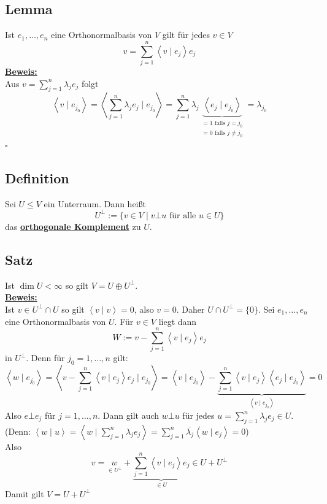 \subsection{Lemma} %
\label{sub:lemma_14.10}
Ist $e_1, \ldots , e_n$ eine Orthonormalbasis von $V$ gilt für jedes $v \in V$
\[
	v = \sum\limits_{j=1}^{n} \left\langle v \mid e_j \right\rangle  e_j 
\]
\underline{\textbf{Beweis:}} \\
Aus $v= \sum\limits_{j=1}^{n} \lambda_j e_j$ folgt
\[
	\left\langle v \mid e_{j_0} \right\rangle = \left\langle \sum\limits_{j=1}^{n} \lambda_j e_j \mid e_{j_0} \right\rangle 
	= \sum\limits_{j=1}^{n} \lambda_j \underbrace{\left\langle e_j \mid e_{j_0} \right\rangle}
	_{\substack{= 1 \text{ falls } j=j_0 \\ = 0 \text{ falls }j \not= j_0}}=\lambda_{j_0}
\]
\hfill \( \square \)

\subsection{Definition} %
\label{sub:definition_14.11}
Sei $U \le V$ ein Unterraum. Dann heißt
\[
	U^\bot := \Big\{ v \in V \mid v \bot u \text{ für alle } u \in U \Big\}
\]
das \underline{\textbf{orthogonale Komplement}} zu $U$.

\subsection{Satz} %
\label{sub:satz_14.12}
Ist $\dim U < \infty$ so gilt $V=U \oplus U^\bot$.
\vspace{10pt} \\
\underline{\textbf{Beweis:}} \\
Ist $v \in U^\bot \cap U$ so gilt $\left\langle v \mid v \right\rangle = 0$, also $v=0$. Daher $U \cap U^\bot = \{0\}$. Sei $e_1, \ldots , e_n$ eine Orthonormalbasis von
$U$. Für $v \in V$ liegt dann 
\[
	W := v- \sum\limits_{j=1}^{n} \left\langle v \mid e_j \right\rangle e_j
\]
in $U^\bot$. Denn für $j_0 = 1, \ldots , n$ gilt:
\[
	\left\langle w \mid e_{j_0} \right\rangle = \left\langle v - \sum\limits_{j=1}^{n} \left\langle v \mid e_j \right\rangle e_j \mid e_{j_0} \right\rangle 
	= \left\langle v \mid e_{j_0} \right\rangle - \underbrace{\sum\limits_{j=1}^{n} \left\langle v \mid e_j \right\rangle \left\langle e_j \mid e_{j_0} \right\rangle }
	_{\left\langle v \mid e_{j_0} \right\rangle } = 0
\]
Also $e \bot e_j$ für $j= 1, \ldots , n$. Dann gilt auch $w \bot u$ für jedes $u = \sum\limits_{j=1}^{n} \lambda_j e_j \in U$. \\
(Denn: $\left\langle w \mid u \right\rangle = \left\langle w \mid \sum\limits_{j=1}^{n} \lambda_j e_j \right\rangle = \sum\limits_{j=1}^{n} \overline{\lambda_j}
\left\langle w \mid e_j \right\rangle = 0  $) \\
Also
\[
	v = \underset{\in U^\bot}{w} + \underbrace{\sum\limits_{j=1}^{n} \left\langle v \mid e_j \right\rangle e_j}_{\in U} \in U + U^\bot
\]
Damit gilt $V= U + U^\bot$

